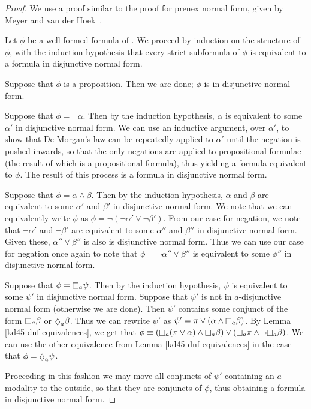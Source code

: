 \begin{proof}
We use a proof similar to the proof for prenex normal form, given by Meyer and
van der Hoek~\cite{meyer2004epistemic}.

Let $\phi$ be a well-formed formula of \logicKD{}. We proceed by induction on
the structure of $\phi$, with the induction hypothesis that every strict
subformula of $\phi$ is equivalent to a formula in disjunctive normal form.

Suppose that $\phi$ is a proposition. Then we are done; $\phi$ is in disjunctive
normal form.

Suppose that $\phi = \neg \alpha$. Then by the induction hypothesis, $\alpha$ is
equivalent to some $\alpha'$ in disjunctive normal form. We can use an inductive
argument, over $\alpha'$, to show that De Morgan's law can be repeatedly applied
to $\alpha'$ until the negation is pushed inwards, so that the only negations
are applied to propositional formulae (the result of which is a propositional
formula), thus yielding a formula equivalent to $\phi$. The result of this
process is a formula in disjunctive normal form.

Suppose that $\phi = \alpha \land \beta$. Then by the induction hypothesis, $\alpha$
and $\beta$ are equivalent to some $\alpha'$ and $\beta'$ in disjunctive normal
form. We note that we can equivalently write $\phi$ as $\phi = \neg (\neg
\alpha' \lor \neg \beta')$. From our case for negation, we note that $\neg
\alpha'$ and $\neg \beta'$ are equivalent to some $\alpha''$ and $\beta''$ in
disjunctive normal form. Given these, $\alpha'' \lor \beta''$ is also is
disjunctive normal form. Thus we can use our case for negation once again to
note that $\phi = \neg \alpha'' \lor \beta''$ is equivalent to some $\phi''$ in
disjunctive normal form.

Suppose that $\phi = \knows_a \psi$. Then by the induction hypothesis, $\psi$ is
equivalent to some $\psi'$ in disjunctive normal form. Suppose that $\psi'$ is
not in $a$-disjunctive normal form (otherwise we are done). Then $\psi'$
contains some conjunct of the form $\knows_a \beta$ or $\suspects_a \beta$. Thus
we can rewrite $\psi'$ as $\psi' = \pi \lor (\alpha \land \knows_a \beta)$. By
Lemma \ref{kd45-dnf-equivalences}, we get that $\phi \equiv (\knows_a (\pi \lor
\alpha) \land \knows_a \beta) \lor (\knows_a \pi \land \neg \knows_a \beta)$. We
can use the other equivalence from Lemma \ref{kd45-dnf-equivalences} in the case
that $\phi = \suspects_a \psi$.

Proceeding in this fashion we may move all conjuncts of $\psi'$ containing an
$a$-modality to the outside, so that they are conjuncts of $\phi$, thus
obtaining a formula in disjunctive normal form.
\end{proof}


